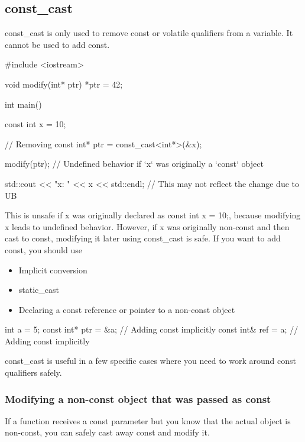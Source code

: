 \documentclass{report}
\begin{document}
    \subsection{const\_cast}
    \bigbreak \noindent 
    const\_cast is only used to remove const or volatile qualifiers from a variable. It cannot be used to add const.
    \bigbreak \noindent 
    \begin{cppcode}
        #include <iostream>

        void modify(int* ptr) {
            *ptr = 42;
        }

        int main() {
            const int x = 10;

            // Removing const
            int* ptr = const_cast<int*>(&x);

            modify(ptr); // Undefined behavior if `x` was originally a `const` object

            std::cout << "x: " << x << std::endl; // This may not reflect the change due to UB
        }
    \end{cppcode}
    \bigbreak \noindent 
    This is unsafe if x was originally declared as const int x = 10;, because modifying x leads to undefined behavior. However, if x was originally non-const and then cast to const, modifying it later using const\_cast is safe.
    \bigbreak \noindent 
    If you want to add const, you should use
    \begin{itemize}
        \item Implicit conversion
        \item static\_cast
        \item Declaring a const reference or pointer to a non-const object
    \end{itemize}
    \bigbreak \noindent 
    \begin{cppcode}
        int a = 5;
        const int* ptr = &a; // Adding const implicitly
        const int& ref = a;  // Adding const implicitly
    \end{cppcode}
    \bigbreak \noindent 
    const\_cast is useful in a few specific cases where you need to work around const qualifiers safely. 
    \bigbreak \noindent 
    \subsubsection{Modifying a non-const object that was passed as const}
    \bigbreak \noindent 
    If a function receives a const parameter but you know that the actual object is non-const, you can safely cast away const and modify it.
    \bigbreak \noindent 
\end{document}
